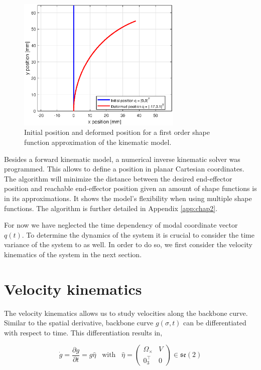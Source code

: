 \newpage

\begin{figure}[H]
    \centering
    \includegraphics[width = 0.7\textwidth]{Figures/Chapter2/fkin1701.eps}
    \caption{Initial position and deformed position for a first order shape function approximation of the kinematic model.}
    \label{fig1:forward_kinematic}
\end{figure}

Besides a forward kinematic model, a numerical inverse kinematic solver was programmed. This allows to define a position in planar Cartesian coordinates. The algorithm will minimize the distance between the desired end-effector position and reachable end-effector position given an amount of shape functions is in its approximations. It shows the model's flexibility when using multiple shape functions. The algorithm is further detailed in Appendix \ref{app:chap2}. 

For now we have neglected the time dependency of modal coordinate vector $q(t)$. To determine the dynamics of the system it is crucial to consider the time variance of the system to as well. In order to do so, we first consider the velocity kinematics of the system in the next section.


\section{Velocity kinematics}

The velocity kinematics allows us to study velocities along the backbone curve. Similar to the spatial derivative, backbone curve $g(\sigma,t)$ can be differentiated with respect to time. This differentiation results in, 

\begin{equation}
  \Dot{g} = \frac{\partial g}{\partial t} = g \hat{\eta} \hspace{10pt} \text{with} \hspace{10pt}  \hat{\eta} = \begin{pmatrix} \Omega_\times & V \\ 0_3^\top & 0 \end{pmatrix} \in  \mathfrak{se}(2)
    \label{eq2:dgdt}
\end{equation}

